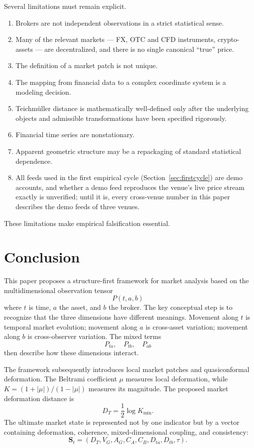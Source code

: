 \documentclass[11pt,a4paper]{article}
\numberwithin{equation}{section}
\newcommand{\abs}[1]{\left|#1\right|}
\begin{document}
Several limitations must remain explicit.
\begin{enumerate}
\item Brokers are not independent observations in a strict
      statistical sense.
\item Many of the relevant markets --- FX, OTC and CFD instruments,
      crypto-assets --- are decentralized, and there is no single
      canonical ``true'' price.
\item The definition of a market patch is not unique.
\item The mapping from financial data to a complex coordinate system
      is a modeling decision.
\item Teichmüller distance is mathematically well-defined only after
      the underlying objects and admissible transformations have
      been specified rigorously.
\item Financial time series are nonstationary.
\item Apparent geometric structure may be a repackaging of standard
      statistical dependence.
\item All feeds used in the first empirical cycle
      (Section~\ref{sec:firstcycle}) are demo accounts, and whether
      a demo feed reproduces the venue's live price stream exactly
      is unverified; until it is, every cross-venue number in this
      paper describes the demo feeds of three venues.
\end{enumerate}
These limitations make empirical falsification essential.

\section{Conclusion}

This paper proposes a structure-first framework for market analysis
based on the multidimensional observation tensor
\[
\boxed{P(t,a,b)}
\]
where $t$ is time, $a$ the asset, and $b$ the broker. The key
conceptual step is to recognize that the three dimensions have
different meanings. Movement along $t$ is temporal market evolution;
movement along $a$ is cross-asset variation; movement along $b$ is
cross-observer variation. The mixed terms
\[
\boxed{P_{ta},\quad P_{tb},\quad P_{ab}}
\]
then describe how these dimensions interact.

The framework subsequently introduces local market patches and
quasiconformal deformation. The Beltrami coefficient $\mu$ measures
local deformation, while $K=(1+\abs{\mu})/(1-\abs{\mu})$ measures
its magnitude. The proposed market deformation distance is
\[
\boxed{D_T=\frac12\log K_{\min}.}
\]
The ultimate market state is represented not by one indicator but by
a vector containing deformation, coherence, mixed-dimensional
coupling, and consistency:
\[
\boxed{
\mathbf{S}_t=
\left(D_T,V_G,A_G,C_A,C_B,D_{ta},D_{tb},\tau\right).
}
\]
\end{document}
